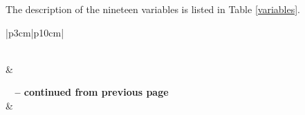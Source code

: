 \documentclass{jpp}
\begin{document}
The description of the nineteen variables is listed in Table \ref{variables}.

\begin{center}
\begin{longtable}{|p{3cm}|p{10cm}|}
\caption{Variables Description} \label{variables} \\

\hline {} &   \\ \hline 
\endfirsthead

%
{{\bfseries \tablename\ \thetable{} -- continued from previous page}} \\
\hline {} &  \\ \hline 
\endhead

\hline {} \\ \hline
\endfoot

\hline \hline
\endlastfoot



\end{longtable}
\end{center}
\end{document}
